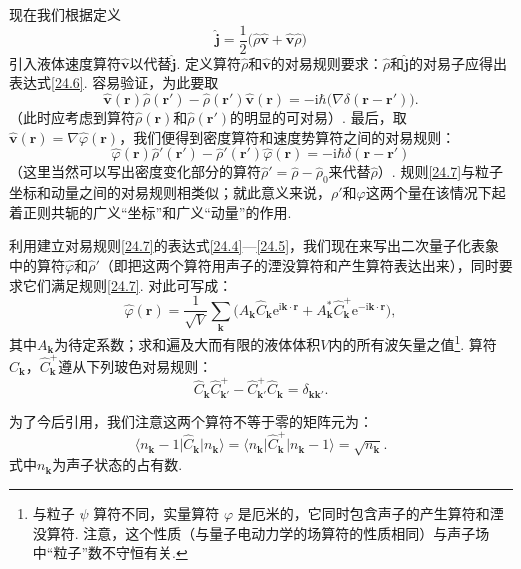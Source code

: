 现在我们根据定义
\begin{equation*}
\hat{\bm{j}}=\frac{1}{2}\bigl(\hat{\rho}\hat{\bm{v}}+\hat{\bm{v}}\hat{\rho}\bigr)
\end{equation*}
引入液体速度算符$\hat{\bm{v}}$以代替$\hat{\bm{j}}$. 定义算符$\hat{\rho}$和$\hat{\bm{v}}$的对易规则要求：$\hat{\rho}$和$\hat{\bm{j}}$的对易子应得出表达式\eqref{24.6}. 容易验证，为此要取
\begin{equation*}
\hat{\bm{v}}(\bm{r})\hat{\rho}(\bm{r}')-\hat{\rho}(\bm{r}')\hat{\bm{v}}(\bm{r})
=-\mathrm{i}\hbar\bigl(\nabla\delta(\bm{r}-\bm{r}')\bigr).
\end{equation*}
（此时应考虑到算符$\hat{\rho}(\bm{r})$和$\hat{\rho}(\bm{r}')$的明显的可对易）. 最后，取$\hat{\bm{v}}(\bm{r})=\nabla\hat{\varphi}(\bm{r})$，我们便得到密度算符和速度势算符之间的对易规则：
\begin{equation}
\hat{\varphi}(\bm{r})\hat{\rho}'(\bm{r}')-\hat{\rho}'(\bm{r}')\hat{\varphi}(\bm{r})
=-\mathrm{i}\hbar\delta(\bm{r}-\bm{r}')
\label{24.7}
\end{equation}
（这里当然可以写出密度变化部分的算符$\hat{\rho}'=\hat{\rho}-\hat{\rho}_{0}$来代替$\hat{\rho}$）. 规则\eqref{24.7}与粒子坐标和动量之间的对易规则相类似；就此意义来说，$\rho'$和$\varphi$这两个量在该情况下起着正则共轭的广义“坐标”和广义“动量”的作用.

利用建立对易规则\eqref{24.7}的表达式\eqref{24.4}—\eqref{24.5}，我们现在来写出二次量子化表象中的算符$\hat{\varphi}$和$\hat{\rho}'$（即把这两个算符用声子的湮没算符和产生算符表达出来），同时要求它们满足规则\eqref{24.7}. 对此可写成：
\begin{equation*}
\hat{\varphi}(\bm{r})=\frac{1}{\sqrt{V}}\sum_{\bm{k}}
\bigl(A_{\bm{k}}\hat{C}_{\bm{k}}\mathrm{e}^{\mathrm{i}\bm{k}\cdot\bm{r}}
+A^{*}_{\bm{k}}\hat{C}^{+}_{\bm{k}}\mathrm{e}^{-\mathrm{i}\bm{k}\cdot\bm{r}}\bigr),
\end{equation*}
其中$A_{\bm{k}}$为待定系数；求和遍及大而有限的液体体积$V$内的所有波矢量之值\footnote{与粒子 $\psi$ 算符不同，实量算符 $\varphi$ 是厄米的，它同时包含声子的产生算符和湮没算符. 注意，这个性质（与量子电动力学的场算符的性质相同）与声子场中“粒子”数不守恒有关.}. 算符$\hat{C}_{\bm{k}}$，$\hat{C}^{+}_{\bm{k}}$遵从下列玻色对易规则：
\begin{equation}
\hat{C}_{\bm{k}}\hat{C}^{+}_{\bm{k}'}-\hat{C}^{+}_{\bm{k}'}\hat{C}_{\bm{k}}=\delta_{\bm{k}\bm{k}'}.
\label{24.8}
\end{equation}

为了今后引用，我们注意这两个算符不等于零的矩阵元为：
\begin{equation}
\langle n_{\bm{k}}-1\vert\hat{C}_{\bm{k}}\vert n_{\bm{k}}\rangle
=\langle n_{\bm{k}}\vert\hat{C}^{+}_{\bm{k}}\vert n_{\bm{k}}-1\rangle=\sqrt{n_{\bm{k}}}.
\label{24.9}
\end{equation}
式中$n_{\bm{k}}$为声子状态的占有数.

